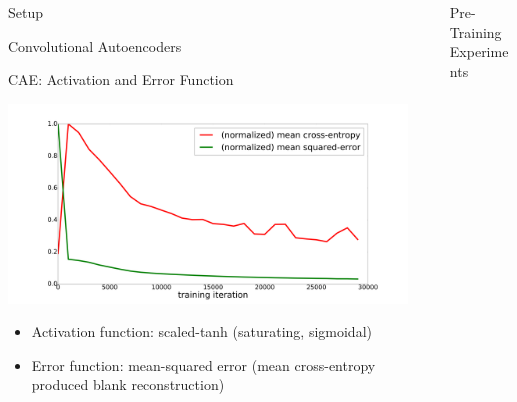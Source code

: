 \documentclass[final]{beamer}
\newlength{\sepwid}
\newlength{\onecolwid}
\newlength{\threecolwid}
\begin{document}
\begin{frame}[t]
\begin{columns}[t]
\begin{column}{\onecolwid}
\begin{alertblock}{Setup}
\begin{block}{Convolutional Autoencoders}
\end{block}

\begin{block}{CAE: Activation and Error Function}
	\centering

	\includegraphics[width=.7\linewidth]{../graphics/mse_ce_comparison.png}

	\begin{itemize}
		\item Activation function: scaled-tanh (saturating, sigmoidal)
		\item Error function: mean-squared error (mean cross-entropy produced blank reconstruction)
	\end{itemize}

\end{block}


\end{alertblock}


\end{column} %


\begin{column}{\sepwid}\end{column} %


\begin{column}{\threecolwid}


\begin{alertblock}{Pre-Training Experiments}

\centering

\begin{columns}[t, totalwidth=0.9\threecolwid] %





\end{columns}
\end{alertblock}
\end{column}
\end{columns}
\end{frame}
\end{document}
